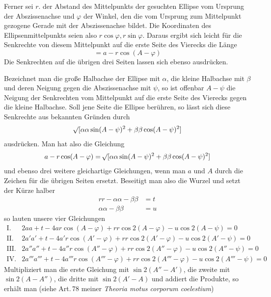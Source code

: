 \par
{}%
Ferner sei \(r\). der Abstand des Mittelpunkts der gesuchten Ellipse vom Ursprung der Abszissenachse und \(\varphi\) der Winkel, den die vom Ursprung zum Mittelpunkt gezogene Gerade mit der Abszissenachse bildet. Die Koordinaten des Ellipsenmittelpunkts seien also \(r\cos\varphi,r\sin\varphi\). Daraus ergibt sich leicht für die Senkrechte von diesem Mittelpunkt auf die erste Seite des Vierecks die Länge
\[
=a-r\cos(A-\varphi)
\]
Die Senkrechten auf die übrigen drei Seiten lassen sich ebenso ausdrücken.

Bezeichnet man die große Halbachse der Ellipse mit \(\alpha\), die kleine Halbachse mit \(\beta\) und deren Neigung gegen die Abszissenachse mit \(\psi\), so ist offenbar \(A-\psi\) die Neigung der Senkrechten vom Mittelpunkt auf die erste Seite des Vierecks gegen die kleine Halbachse. Soll jene Seite die Ellipse berühren, so lässt sich diese Senkrechte aus bekannten Gründen durch
\[
\mathord{{}^{}\!\surd}[\alpha\alpha\sin(A-\psi)^2+\beta\beta\cos(A-\psi)^2]
\]
ausdrücken. Man hat also die Gleichung
\[
a-r\cos(A-\varphi)=\mathord{{}^{}\!\surd}[\alpha\alpha\sin(A-\psi)^2+\beta\beta\cos(A-\psi)^2]
\]
und ebenso drei weitere gleichartige Gleichungen, wenn man \(a\) und \(A\) durch die Zeichen für die übrigen Seiten ersetzt. Beseitigt man also die Wurzel und setzt der Kürze halber
\[
\begin{aligned}
rr-\alpha\alpha-\beta\beta&=t\\
\alpha\alpha-\beta\beta&=u
\end{aligned}
\]
so lauten unsere vier Gleichungen
\begingroup\fontsize{10}{12}\selectfont
\[
\begin{array}{rl}
\mathrm{I.}&2aa+t-4ar\cos(A-\varphi)+rr\cos2(A-\varphi)-u\cos2(A-\psi)=0\\
\mathrm{II.}&2a'a'+t-4a'r\cos(A'-\varphi)+rr\cos2(A'-\varphi)-u\cos2(A'-\psi)=0\\
\mathrm{III.}&2a''a''+t-4a''r\cos(A''-\varphi)+rr\cos2(A''-\varphi)-u\cos2(A''-\psi)=0\\
\mathrm{IV.}&2a'''a'''+t-4a'''r\cos(A'''-\varphi)+rr\cos2(A'''-\varphi)-u\cos2(A'''-\psi)=0
\end{array}
\]
\endgroup
Multipliziert man die erste Gleichung mit \(\sin2(A''-A')\), die zweite mit \(\sin2(A-A'')\), die dritte mit \(\sin2(A'-A)\) und addiert die Produkte, so erhält man (siehe Art.\,78 meiner \textit{Theoria motus corporum coelestium})
